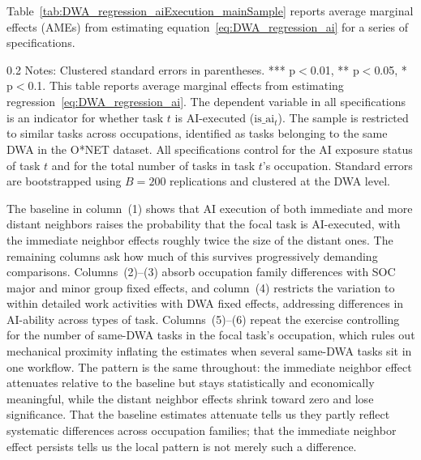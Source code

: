Table~\ref{tab:DWA_regression_aiExecution_mainSample} reports average marginal effects (AMEs) from estimating equation~\eqref{eq:DWA_regression_ai} for a series of specifications.
\begin{table}[!t]
\centering
\caption{Effect of Neighboring Tasks' AI Execution Status on Task's AI Execution}
\label{tab:DWA_regression_aiExecution_mainSample}
    \footnotesize
\resizebox{\textwidth}{!}{

}
\begin{minipage}{1\linewidth}
\begin{spacing}{0.2}
{\fontsize{9.5pt}{10pt}\selectfont Notes: Clustered standard errors in parentheses. *** p$<$0.01, ** p$<$0.05, * p$<$0.1.
This table reports average marginal effects from estimating regression~\eqref{eq:DWA_regression_ai}.
The dependent variable in all specifications is an indicator for whether task $t$ is AI-executed ($\text{is\_ai}_{t}$).
The sample is restricted to similar tasks across occupations, identified as tasks belonging to the same DWA in the O*NET dataset.
All specifications control for the AI exposure status of task $t$ and for the total number of tasks in task $t$'s occupation.
Standard errors are bootstrapped using $B=200$ replications and clustered at the DWA level.}
\end{spacing}
\end{minipage}\end{table}
The baseline in column~(1) shows that AI execution of both immediate and more distant neighbors raises the probability that the focal task is AI-executed, with the immediate neighbor effects roughly twice the size of the distant ones.
The remaining columns ask how much of this survives progressively demanding comparisons.
Columns~(2)--(3) absorb occupation family differences with SOC major and minor group fixed effects, and column~(4) restricts the variation to within detailed work activities with DWA fixed effects, addressing differences in AI-ability across types of task.
Columns~(5)--(6) repeat the exercise controlling for the number of same-DWA tasks in the focal task's occupation, which rules out mechanical proximity inflating the estimates when several same-DWA tasks sit in one workflow.
The pattern is the same throughout: the immediate neighbor effect attenuates relative to the baseline but stays statistically and economically meaningful, while the distant neighbor effects shrink toward zero and lose significance.
That the baseline estimates attenuate tells us they partly reflect systematic differences across occupation families; that the immediate neighbor effect persists tells us the local pattern is not merely such a difference.


